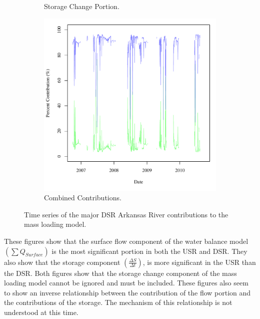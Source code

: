 \begin{figure}[htbp]
\begin{subfigure}{0.5\textwidth}
		\caption{Storage Change Portion.}
	\end{subfigure}
	\tablevspace
	\begin{subfigure}{0.5\textwidth}
		\centering
		\includegraphics[width=\tableCustomSize]{"Figures/Results_DSR/Stochastic/M Mass Contrib 3"}
		\caption{Combined Contributions.}
	\end{subfigure}
	\caption[Time series of the major DSR Arkansas River contributions to the mass loading model.]{Time series of the major DSR Arkansas River contributions to the mass loading model.}
	\label{fig:DSRMassContrib}
\end{figure}

These figures show that the surface flow component of the water balance model $ \displaystyle \left( \sum Q_{Surface} \right) $ is the most significant portion in both the USR and DSR.  They also show that the storage component $ \displaystyle \left( \frac{\Delta S}{\Delta t} \right) $, is more significant in the USR than the DSR.  Both figures show that the storage change component of the mass loading model cannot be ignored and must be included.  These figures also seem to show an inverse relationship between the contribution of the flow portion and the contributions of the storage.  The mechanism of this relationship is not understood at this time.

